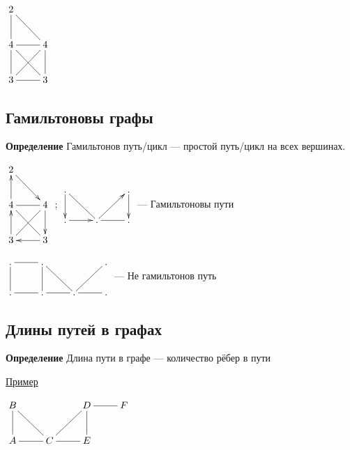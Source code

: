 \documentclass[a4paper, 12pt] {article}
\begin{document}
$ \begin{matrix}
	\xymatrix{
		2 \ar@{-}[rd]  \ar@{-}[d]  \\
		4 \ar@{-}[d] \ar@{-}[r] \ar@{-}[rd]& 4 \ar@{-}[ld] \ar@{-}[d]  \\
		3 \ar@{-}[r] & 3 \\
	}
\end{matrix} $\\

\subsection{Гамильтоновы графы}

\textbf{Определение} Гамильтонов путь/цикл --- простой путь/цикл на всех вершинах.

$ \begin{matrix}
	\xymatrix{
		2 \ar@{->}[rd]  \ar@{<-}[d]  \\
		4 \ar@{<-}[d] \ar@{-}[r] \ar@{-}[rd]& 4 \ar@{-}[ld] \ar@{->}[d]  \\
		3 \ar@{<-}[r] & 3 \\
	}
\end{matrix} $ ;        
$ \begin{matrix}
	\xymatrix{
		. \ar@{->}[d] \ar@{-}[rd] & & . \ar@{->}[d] \ar@{<-}[ld]\\
		. \ar@{->}[r] & . & . \ar@{-}[l] \\
	}
\end{matrix} $ --- Гамильтоновы пути


$ \begin{matrix}
	\xymatrix{
		.\ar@{-}[d] \ar@{-}[r] & . \ar@{-}[d] \ar@{-}[rd] & & .  \ar@{-}[ld]\\
		. \ar@{-}[r] & . \ar@{-}[r] & . & . \ar@{-}[l] \\
	}
\end{matrix} $ --- Не гамильтонов путь

\subsection{Длины путей в графах}

\textbf{Определение} Длина пути в графе --- количество рёбер в пути

\underline{Пример}

$ \begin{matrix}
	\xymatrix{
		 B \ar@{-}[d] \ar@{-}[rd] & & D  \ar@{-}[ld] \ar@{-}[d] \ar@{-}[r] & F\\
		A \ar@{-}[r] & C & E \ar@{-}[l] \\
	}
\end{matrix} $ 
\end{document}
